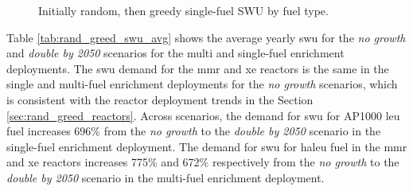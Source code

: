 \begin{figure}[H]
    \hfill
    \caption{Initially random, then greedy single-fuel SWU by fuel type.}
    \label{fig:rand_greed_of_swu}
\end{figure}


Table \ref{tab:rand_greed_swu_avg} shows the average yearly \gls{swu} for the \textit{no growth} and \textit{double by 2050} scenarios for the multi and single-fuel enrichment deployments. The \gls{swu} demand for the \gls{mmr} and \gls{xe} reactors is the same in the single and multi-fuel enrichment deployments for the \textit{no growth} scenarios, which is consistent with the reactor deployment trends in the Section \ref{sec:rand_greed_reactors}. Across scenarios, the demand for \gls{swu} for AP1000 \gls{leu} fuel increases 696\% from the \textit{no growth} to the \textit{double by 2050} scenario in the single-fuel enrichment deployment. The demand for \gls{swu} for \gls{haleu} fuel in the \gls{mmr} and \gls{xe} reactors increases 775\% and 672\% respectively from the \textit{no growth} to the \textit{double by 2050} scenario in the multi-fuel enrichment deployment.

